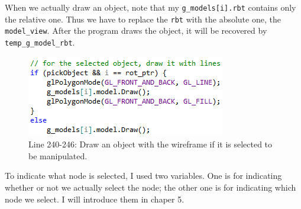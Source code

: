 \documentclass[11pt]{article}
\begin{document}
When we actually draw an object, note that my \texttt{g\_models[i].rbt} contains only the relative one. Thus we have to replace the \texttt{rbt} with the absolute one, the \texttt{model\_view}. After the program draws the object, it will be recovered by \texttt{temp\_g\_model\_rbt}.
\begin{figure}[htb]
	\begin{center}
		\includegraphics[width=0.6\linewidth]{drawObjectLine.png}
	\end{center}
	\caption{Line 240-246: Draw an object with the wireframe if it is selected to be manipulated.}
\end{figure}
To indicate what node is selected, I used two variables. One is for indicating whether or not we actually select the node; the other one is for indicating which node we select. I will introduce them in chaper 5.
\end{document}
